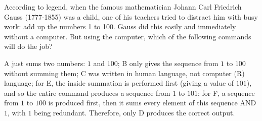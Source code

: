 
According to legend, when the famous mathematician Johann Carl Friedrich Gauss
(1777-1855) was a child, one of his
teachers tried to distract him with busy work: 
add up the numbers 1 to 100.   Gauss did this easily and
immediately without a computer.  But using the computer, which of the
following commands will do the job?

\begin{MultipleChoice}
\end{MultipleChoice}

\begin{AnswerText}
A just sums two numbers: $1$ and $100$; B only gives the sequence from $1$ to $100$ without summing them; C was written in human language, not computer (R) language; for E, the inside summation is performed first (giving a value of $101$), and so the entire command produces a sequence from $1$ to $101$; for F, a sequence from $1$ to $100$ is produced first, then it sums every element of this sequence AND $1$, with $1$ being redundant. Therefore, only D produces the correct output.
\end{AnswerText}
